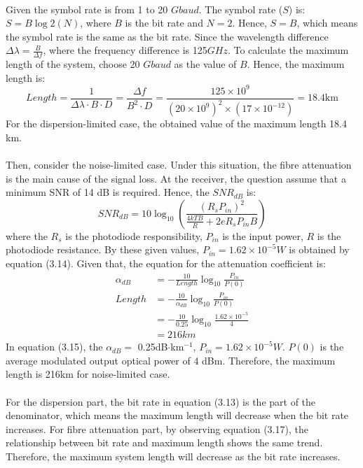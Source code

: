 \documentclass[12pt]{article}
\begin{document}
    \paragraph{}
    Given the symbol rate is from 1 to 20 $Gbaud$. The symbol rate ($S$) is: $S=B\log2(N)$, where $B$ is the bit rate and $N = 2$. Hence, $S=B$, which means the symbol rate is the same as the bit rate. Since the wavelength difference $\Delta \lambda= \frac{B}{\Delta f}$, where the frequency difference is 125$GHz$. To calculate the maximum length of the system, choose 20 $Gbaud$ as the value of $B$. Hence, the maximum length is:
    \begin{equation}
        Length=\frac{1}{\Delta \lambda \cdot B \cdot D}=\frac{\Delta f}{ B^2\cdot D}= \frac{125 \times 10 ^9}{(20 \times 10^9)^2 \times (17 \times 10^{-12}) } = 18.4\mbox{km}
    \end{equation}
    For the dispersion-limited case, the obtained value of the maximum length 18.4 km.
    \paragraph{}
    Then, consider the noise-limited case. Under this situation, the fibre attenuation is the main cause of the signal loss. At the receiver, the question assume that a minimum SNR of 14 dB is required. Hence, the $SNR_{dB}$ is:
    \begin{equation}
        SNR_{dB} = 10 \log_{10} \left( \frac{(R_s P_{in})^2}{\frac{4kTB}{R} + 2 e R_s P_{in} B} \right)
    \end{equation}
    where the $R_s$ is the photodiode responsibility, $P_{in}$ is the input power, $R$ is the photodiode resistance. By these given values, $P_{in}=1.62 \times 10^{-5}W$ is obtained by equation (3.14). Given that, the equation for the attenuation coefficient is:
    \begin{align}
        \alpha_{dB} &= -\frac{10}{Length}\log _{10} \frac{P_{in}}{P(0)}\\
        Length &= -\frac{10}{\alpha_{dB}}\log _{10} \frac{P_{in}}{P(0)}\\
        &=-\frac{10}{0.25}\log _{10} \frac{1.62 \times 10^{-5}}{4}\\
        &=216km
    \end{align}
    In equation (3.15), the $\alpha_{dB}=$ 0.25dB$\cdot$km$^{-1}$, $P_{in}=1.62 \times 10^{-5}W$. $P(0)$ is the average modulated output optical power of 4 dBm. Therefore, the maximum length is 216km for noise-limited case.
    \paragraph{}
    For the dispersion part, the bit rate in equation (3.13) is the part of the denominator, which means the maximum length will decrease when the bit rate increases. For fibre attenuation part, by observing equation (3.17), the relationship between bit rate and maximum length shows the same trend. Therefore, the maximum system length will decrease as the bit rate increases.
\end{document}
